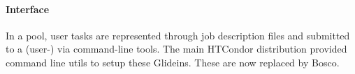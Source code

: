 \documentclass{sig-alternate}
\begin{document}
%
%

\paragraph{Interface}

In a pool, user tasks are represented through job description files and
submitted to a (user-) via command-line tools. The main HTCondor
distribution provided command line utils to setup these Glideins. These are now
replaced by Bosco.

%


%
\end{document}
